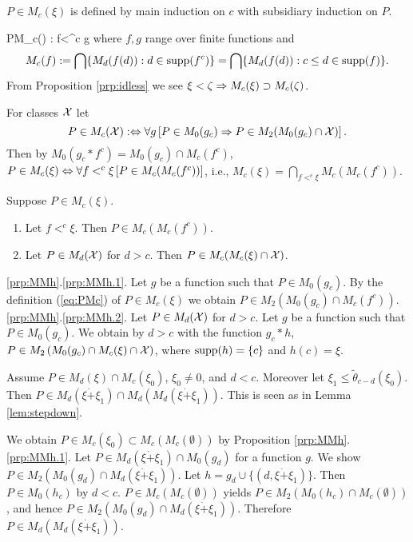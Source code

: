 \documentclass{article}
\begin{document}
$P\in M_{c}(\xi)$ is defined by main induction on $c$ with subsidiary induction on $P$.

\beqn\label{eq:PMc}
P\in M_{c}(\xi) :\Lrarw
 \forall f<^{c}\xi 
 \forall g 
\eeqn
where $f,g$ range over finite functions and
\[
M_{c}(f)  :=  \bigcap\{M_{d}(f(d)): d\in {\rm supp}(f^{c})\}
=
\bigcap\{M_{d}(f(d)): c\leq d\in {\rm supp}(f)\}.
\]
From Proposition \ref{prp:idless} we see
$\xi<\zeta\Rightarrow M_{c}(\xi)\supset M_{c}(\zeta)$.


For classes ${\cal X}$ let
\[
P\in M_{c}({\cal X}) :\Leftrightarrow \forall g\left[P\in M_{0}(g_{c}) \Rightarrow P\in M_{2}(M_{0}(g_{c})\cap{\cal X})\right].
\]
Then by $M_{0}(g_{c}*f^{c})=M_{0}(g_{c})\cap M_{c}(f^{c})$,
$P\in M_{c}(\xi)\Leftrightarrow \forall f<^{c}\xi\left[P\in M_{c}(M_{c}(f^{c}))\right]$, i.e.,
$M_{c}(\xi)=\bigcap_{f<^{c}\xi}M_{c}(M_{c}(f^{c}))$.


\bprp\label{prp:MMh}
Suppose $P\in M_{c}(\xi)$.
\begin{enumerate}
\item\label{prp:MMh.1}
Let $f<^{c}\xi$.
Then
$P\in M_{c}(M_{c}(f^{c}))$.

\item\label{prp:MMh.2}
Let $P\in M_{d}({\cal X})$ for $d>c$.
Then $P\in M_{c}(M_{c}(\xi)\cap {\cal X})$.
\end{enumerate}
\eprp
\bprf
\ref{prp:MMh}.\ref{prp:MMh.1}.
Let $g$ be a function such that $P\in M_{0}(g_{c})$.
By the definition (\ref{eq:PMc}) of $P\in M_{c}(\xi)$ we obtain
$P\in M_{2}\left( M_{0}(g_{c}) \cap M_{c}(f^{c}) \right)$.
\\
\ref{prp:MMh}.\ref{prp:MMh.2}.
Let $P\in M_{d}({\cal X})$ for $d>c$.
Let $g$ be a function such that $P\in M_{0}(g_{c})$.
We obtain by $d>c$ with the function $g_{c}*h$,
$P\in M_{2}\left( M_{0}(g_{c}) \cap M_{c}(\xi)\cap {\cal X} \right)$, where
${\rm supp}(h)=\{c\}$ and $h(c)=\xi$.
\eprf




\blem\label{lem:stepdownpi11int}
Assume $P\in M_{d}(\xi)\cap M_{c}(\xi_{0})$, $\xi_{0}\neq 0$,
and $d<c$.
Moreover let 
$\xi_{1}\leq\tilde{\theta}_{c-d}(\xi_{0})$.
Then
$P\in M_{d}(\xi\dot{+}\xi_{1})\cap M_{d}(M_{d}(\xi\dot{+}\xi_{1}))$.
\elem
\bprf
This is seen as in Lemma \ref{lem:stepdown}.
 
 We obtain $P\in M_{c}(\xi_{0})\subset M_{c}(M_{c}(\emptyset))$
 by Proposition \ref{prp:MMh}.\ref{prp:MMh.1}.
 Let $P\in M_{d}(\xi\dot{+}\xi_{1})\cap M_{0}(g_{d})$ for a function $g$.
 We show $P\in M_{2}\left(M_{0}(g_{d})\cap M_{d}(\xi\dot{+}\xi_{1}) \right)$.
 Let $h=g_{d}\cup\{(d,\xi\dot{+}\xi_{1})\}$.
 Then $P\in M_{0}(h_{c})$ by $d<c$.
 $P\in M_{c}(M_{c}(\emptyset))$ yields
$P\in M_{2}\left(M_{0}(h_{c})\cap M_{c}(\emptyset) \right)$, and hence
$P\in M_{2}\left(M_{0}(g_{d})\cap M_{d}(\xi\dot{+}\xi_{1}) \right)$.
Therefore $P\in M_{d}(M_{d}(\xi\dot{+}\xi_{1}))$.
\end{document}

